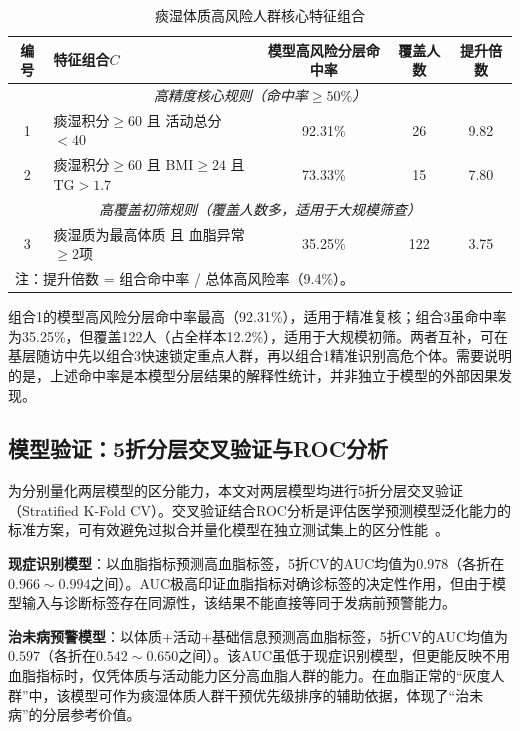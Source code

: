 \documentclass[a4paper,12pt]{ctexart}
\begin{document}
\begin{table}[H]
\centering
\caption{痰湿体质高风险人群核心特征组合}
\label{tab:combo}
\begin{tabular}{clccc}
\toprule
\textbf{编号} & \textbf{特征组合$C$} & \textbf{模型高风险分层命中率} & \textbf{覆盖人数} & \textbf{提升倍数} \\
\midrule
\multicolumn{5}{c}{\textit{高精度核心规则（命中率$\geq 50\%$）}} \\
1 & 痰湿积分$\geq 60$ 且 活动总分$<40$ & 92.31\% & 26 & 9.82 \\
2 & 痰湿积分$\geq 60$ 且 BMI$\geq 24$ 且 TG$>1.7$ & 73.33\% & 15 & 7.80 \\
\midrule
\multicolumn{5}{c}{\textit{高覆盖初筛规则（覆盖人数多，适用于大规模筛查）}} \\
3 & 痰湿质为最高体质 且 血脂异常$\geq 2$项 & 35.25\% & 122 & 3.75 \\
\bottomrule
\multicolumn{5}{l}{\small 注：提升倍数 = 组合命中率 / 总体高风险率（9.4\%）。}
\end{tabular}
\end{table}

组合1的模型高风险分层命中率最高（92.31\%），适用于精准复核；组合3虽命中率为35.25\%，但覆盖122人（占全样本12.2\%），适用于大规模初筛。两者互补，可在基层随访中先以组合3快速锁定重点人群，再以组合1精准识别高危个体。需要说明的是，上述命中率是本模型分层结果的解释性统计，并非独立于模型的外部因果发现。

\subsection{模型验证：5折分层交叉验证与ROC分析}

为分别量化两层模型的区分能力，本文对两层模型均进行5折分层交叉验证（Stratified K-Fold CV）。交叉验证结合ROC分析是评估医学预测模型泛化能力的标准方案，可有效避免过拟合并量化模型在独立测试集上的区分性能~\cite{hou2022depression}。

\textbf{现症识别模型}：以血脂指标预测高血脂标签，5折CV的AUC均值为$0.978$（各折在$0.966\sim0.994$之间）。AUC极高印证血脂指标对确诊标签的决定性作用，但由于模型输入与诊断标签存在同源性，该结果不能直接等同于发病前预警能力。

\textbf{治未病预警模型}：以体质+活动+基础信息预测高血脂标签，5折CV的AUC均值为$0.597$（各折在$0.542\sim0.650$之间）。该AUC虽低于现症识别模型，但更能反映不用血脂指标时，仅凭体质与活动能力区分高血脂人群的能力。在血脂正常的``灰度人群''中，该模型可作为痰湿体质人群干预优先级排序的辅助依据，体现了``治未病''的分层参考价值。
\end{document}

